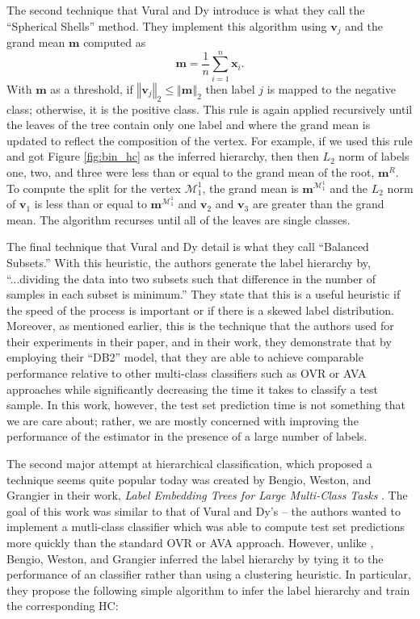 \documentclass[../thesis.tex]{subfiles}
\begin{document}
The second technique that Vural and Dy introduce is what they call the ``Spherical Shells'' method. They implement this algorithm using $\mathbf{v}_j$ and the grand mean $\mathbf{m}$ computed as
\begin{equation}
    \mathbf{m} = \frac{1}{n}\sum_{i=1}^n \mathbf{x}_i.
\end{equation}
With $\mathbf{m}$ as a threshold, if $\left \Vert \mathbf{v}_j \right \Vert_2 \leq \left \Vert \mathbf{m} \right \Vert_2$ then label $j$ is mapped to the negative class; otherwise, it is the positive class. This rule is again applied recursively until the leaves of the tree contain only one label and where the grand mean is updated to reflect the composition of the vertex. For example, if we used this rule and got Figure \ref{fig:bin_hc} as the inferred hierarchy, then then $L_2$ norm of labels one, two, and three were less than or equal to the grand mean of the root, $\mathbf{m}^R$. To compute the split for the vertex $\mathcal{M}_1^1$, the grand mean is $\mathbf{m}^{\mathcal{M}_1^1}$ and the $L_2$ norm of $\mathbf{v}_1$ is less than or equal to $\mathbf{m}^{\mathcal{M}_1^1}$ and $\mathbf{v}_2$ and $\mathbf{v}_3$ are greater than the grand mean. The algorithm recurses until all of the leaves are single classes.

The final technique that Vural and Dy detail is what they call ``Balanced Subsets.'' With this heuristic, the authors generate the label hierarchy by,  ``...dividing the data into two subsets such that difference in the number of samples in each subset is minimum.'' They state that this is a useful heuristic if the speed of the process is important or if there is a skewed label distribution.  Moreover, as mentioned earlier, this is the technique that the authors used for their experiments in their paper, and in their work, they demonstrate that by employing their ``DB2'' model, that they are able to achieve comparable performance relative to other multi-class classifiers such as OVR or AVA approaches while significantly decreasing the time it takes to classify a test sample. In this work, however, the test set prediction time is not something that we are care about; rather, we are mostly concerned with improving the performance of the estimator in the presence of a large number of labels.

The second major attempt at hierarchical classification, which proposed a technique seems quite popular today was created by Bengio, Weston, and Grangier in their work, \textit{Label Embedding Trees for Large Multi-Class Tasks} \cite{bengio2010label}. The goal of this work was similar to that of Vural and Dy's -- the authors wanted to implement a mutli-class classifier which was able to compute test set predictions more quickly than the standard OVR or AVA approach. However, unlike \cite{vural2004hierarchical}, Bengio, Weston, and Grangier inferred the label hierarchy by tying it to the performance of an classifier rather than using a clustering heuristic. In particular, they propose the following simple algorithm to infer the label hierarchy and train the corresponding HC:
\end{document}
